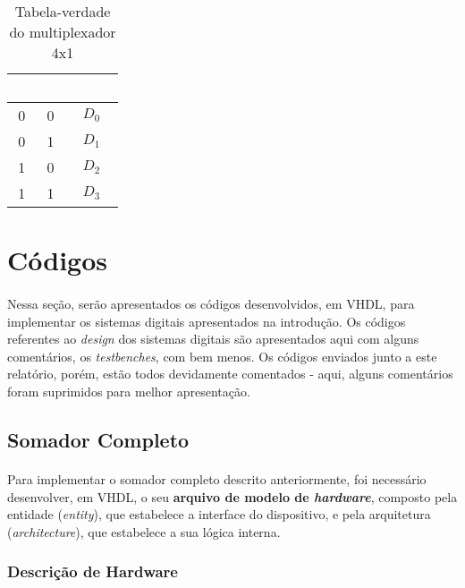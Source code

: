 \documentclass[a4paper,12pt]{article}
\begin{document}
\begin{table}[H]
    \centering
    \begin{tabular}{|c|c|c|}
        \hline
        \rowcolor{black}
        \textcolor{white}{$S_1$} & \textcolor{white}{$S_0$} & \textcolor{white}{Saída} \\ \hline
        0 & 0 & $D_0$ \\ \hline
        \rowcolor{cinza}
        0 & 1 & $D_1$ \\ \hline
        1 & 0 & $D_2$ \\ \hline
        \rowcolor{cinza}
        1 & 1 & $D_3$ \\ \hline
    \end{tabular}
    \caption{Tabela-verdade do multiplexador 4x1}
\end{table}

\newpage

\section{Códigos}
\paragraph{}
Nessa seção, serão apresentados os códigos desenvolvidos, em VHDL, para implementar os sistemas digitais apresentados na introdução. Os códigos referentes ao \textit{design} dos sistemas digitais são apresentados aqui com alguns comentários, os \textit{testbenches}, com bem menos. Os códigos enviados junto a este relatório, porém, estão todos devidamente comentados - aqui, alguns comentários foram suprimidos para melhor apresentação.

\subsection{Somador Completo}
\paragraph{}
Para implementar o somador completo descrito anteriormente, foi necessário desenvolver, em VHDL, o seu \textbf{arquivo de modelo de \textit{hardware}}, composto pela entidade (\textit{entity}), que estabelece a interface do dispositivo, e pela arquitetura (\textit{architecture}), que estabelece a sua lógica interna.

\subsubsection{Descrição de Hardware}
\end{document}
